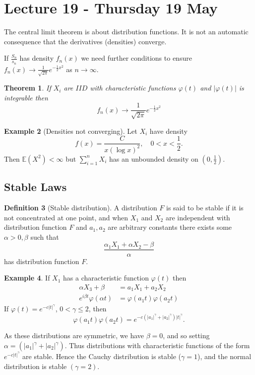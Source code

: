 \documentclass[10pt, oneside, reqno]{amsart}
\theoremstyle{plain}%
\newtheorem{thm}{Theorem}[section]
\theoremstyle{definition}
\newtheorem{defn}[thm]{Definition}
\newtheorem{exmp}[thm]{Example}
\theoremstyle{remark}
\renewcommand{\phi}{\varphi}
\newcommand{\E}{\mathbb{E}}
\begin{document}
\section{Lecture 19 - Thursday 19 May} %
\label{sec:lecture_19_thursday_19_may}
The central limit theorem is about distribution functions.  It is not an automatic consequence that the derivatives (densities) converge.  

If $\frac{S_n}{s_n}$ has density $f_n(x)$ we need further conditions to ensure $f_n(x) \rightarrow \frac{1}{\sqrt{2 \pi}} e^{- \frac{1}{2} x^2}$ as $n \rightarrow \infty$.  

\begin{thm}
	If $X_i$ are $IID$ with characteristic functions $\phi(t)$ and $|\phi(t)|$ is integrable then \[
		f_n(x) \rightarrow \frac{1}{\sqrt{2 \pi}} e^{-\frac{1}{2} x^2}
	\]
\end{thm}

\begin{exmp}[Densities not converging]
	Let $X_i$ have density \[
		f(x) = \frac{C}{x (\log x)^2}, \quad 0 < x < \frac{1}{2}.
	\] Then $\E(X^2) < \infty$ but $\sum_{i=1}^n X_i$ has an unbounded density on $(0, \frac{1}{2})$.
\end{exmp}

\subsection{Stable Laws} %
\label{sub:stable_laws}
\begin{defn}[Stable distribution]
	A distribution $F$ is said to be stable if it is not concentrated at one point, and when $X_1$ and $X_2$ are independent with distribution function $F$ and $a_1, a_2$ are arbitrary constants there exists some $\alpha > 0, \beta$ such that \[
		\frac{\alpha_1 X_1 + \alpha X_2 - \beta}{\alpha}
	\] has distribution function $F$.  	
\end{defn}

\begin{exmp}
	If $X_1$ has a characteristic function $\phi(t)$ then \begin{align*}
		\alpha X_3 + \beta &= a_1 X_1 + a_2 X_2 \\
		e^{i \beta t} \phi(\alpha t) &= \phi(a_1 t) \phi(a_2 t)
	\end{align*}  If $\phi(t) = e^{-c|t|^\gamma}$, $0 < \gamma \leq 2$, then \[
		\phi(a_1 t) \phi(a_2 t) = e^{-c\left( |a_1|^\gamma + |a_2|^\gamma \right) |t|^\gamma}.
		\]

	As these distributions are symmetric, we have $\beta = 0$, and so setting $\alpha = (|a_1|^\gamma + |a_2|^\gamma)$.  Thus distributions with characteristic functions of the form $e^{-c|t|^\gamma}$ are stable.  Hence the Cauchy distribution is stable ($\gamma = 1$), and the normal distribution is stable $(\gamma = 2)$.	
\end{exmp}
\end{document}
